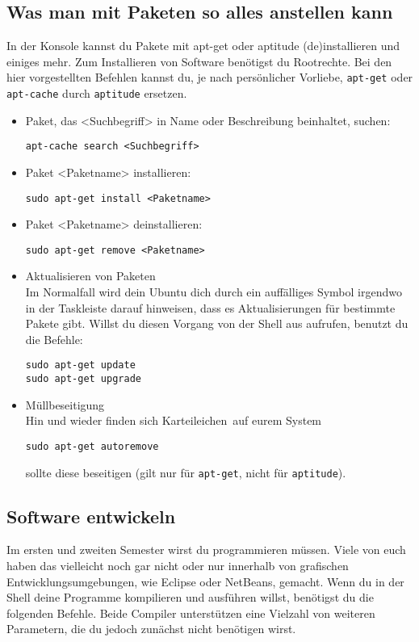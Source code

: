 \documentclass[a4paper,12pt]{article}
\begin{document}
\subsection{Was man mit Paketen so alles anstellen kann}
 In der Konsole kannst du Pakete mit apt-get oder aptitude (de)installieren 
und einiges mehr. Zum Installieren von Software benötigst du Rootrechte. 
Bei den hier vorgestellten Befehlen kannst du, je nach persönlicher Vorliebe,  
\texttt{apt-get} oder \texttt{apt-cache} durch \texttt{aptitude} ersetzen.
\begin{itemize}
\item Paket, das <Suchbegriff> in Name oder Beschreibung beinhaltet, suchen: 
\begin{lstlisting}
apt-cache search <Suchbegriff>
\end{lstlisting} 
\item Paket <Paketname> installieren:
\begin{lstlisting}
sudo apt-get install <Paketname>
\end{lstlisting} 
\item Paket <Paketname> deinstallieren:
\begin{lstlisting}
sudo apt-get remove <Paketname>
\end{lstlisting} 
\item Aktualisieren von Paketen \\
Im Normalfall wird dein Ubuntu dich durch ein auffälliges Symbol irgendwo 
in der Taskleiste darauf hinweisen, dass es Aktualisierungen für bestimmte 
Pakete gibt. Willst du diesen Vorgang von der Shell aus aufrufen, benutzt 
du die Befehle:
\begin{lstlisting}
sudo apt-get update
sudo apt-get upgrade
\end{lstlisting} 
\item Müllbeseitigung \\
Hin und wieder finden sich \glqq Karteileichen\grqq ~auf eurem System
\begin{lstlisting}
sudo apt-get autoremove
\end{lstlisting} 
sollte diese beseitigen (gilt nur für \texttt{apt-get}, nicht für \texttt{aptitude}).
\end{itemize}

\subsection{Software entwickeln}
Im ersten und zweiten Semester wirst du programmieren müssen. Viele von 
euch haben das vielleicht noch gar nicht oder nur innerhalb von grafischen
Entwicklungsumgebungen, wie Eclipse oder NetBeans, gemacht. Wenn du in 
der Shell deine Programme kompilieren und ausführen willst, benötigst du 
die folgenden Befehle. Beide Compiler unterstützen eine Vielzahl von
weiteren Parametern, die du jedoch zunächst nicht benötigen wirst.
\end{document}
